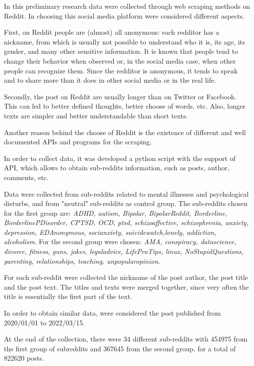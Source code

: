 \documentclass{article}
\begin{document}
In this preliminary research data were collected through web scraping methods on Reddit. In choosing this social media platform were considered different aspects. 

First, on Reddit people are (almost) all anonymous: each redditor has a nickname, from which is usually not possible to understand who it is, its age, its gender, and many other sensitive information. It is known that people tend to change their behavior when observed or, in the social media case, when other people can recognize them. Since the redditor is anonymous, it tends to speak and to share more than it does in other social media or in the real life.

Secondly, the post on Reddit are usually longer than on Twitter or Facebook. This can led to better defined thoughts, better choose of words, etc. Also, longer texts are simpler and better understandable than short texts.

Another reason behind the choose of Reddit is the existence of different and well documented APIs and programs for the scraping.

In order to collect data, it was developed a python script with the support of \cite{pushift} API, which allows to obtain sub-reddits information, such as posts, author, comments, etc.

Data were collected from sub-reddits related to mental illnesses and psychological disturbs, and from "neutral" sub-reddits as control group. The sub-reddits chosen for the first group are: \emph{ADHD, autism, Bipolar, BipolarReddit, Borderline, BorderlinePDisorder, CPTSD, OCD, ptsd, schizoaffective, schizophrenia, anxiety, depression, EDAnonymous, socianxiety, suicidewatch,lonely, addiction, alcoholism}. For the second group were chosen: \emph{AMA, conspiracy, datascience, divorce, fitness, guns, jokes, legaladvice, LifeProTips, linux, NoStupidQuestions, parenting, relationships, teaching, unpopularopinion}.


For each sub-reddit were collected the nickname of the post author, the post title and the post text. The titles and texts were merged together, since very often the title is essentially the first part of the text.


In order to obtain similar data, were considered the post published from 2020/01/01 to 2022/03/15.

At the end of the collection, there were 34 different sub-reddits with 454975 from the first group of subreddits and 367645 from the second group, for a total of 822620 posts.
\end{document}
